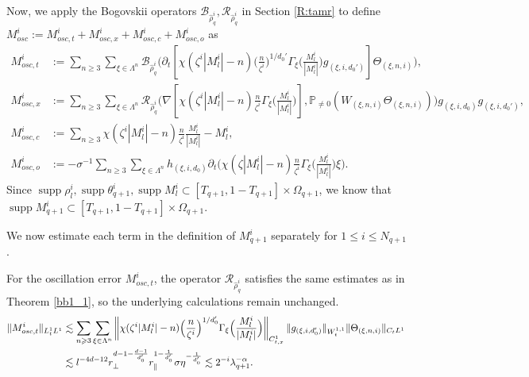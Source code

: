 \documentclass[UTF-8,reqno]{amsart}
\numberwithin{equation}{section}
\theoremstyle{definition}
\DeclareMathOperator{\supp}{supp}
\def\({{\Big(}}
\def\){{\Big)}}
\newcommand{\norm}[1]{\left\|#1\right\|}
\def\geq{\geqslant}
\def\leq{\leqslant}
\def\({{\Big(}}
\def\){{\Big)}}
\def\geq{\geqslant}
\def\leq{\leqslant}
\begin{document}
Now, we  apply the  Bogovskii  operators $\mathcal{B}_{\hat{\rho}_q^i},\mathcal{R}_{\hat{\rho}_q^i}$ in Section \ref{R:tamr} to   define $M^{i}_{osc}:=M^{i}_{osc,t}+M^{i}_{osc,x}+M^{i}_{osc,c}+M^{i}_{osc,o}$ as
\begin{align*}
   M^{i}_{osc,t}&:=\sum_{n\geq3}\sum_{\xi\in\Lambda^{n}}\mathcal{B}_{\hat{\rho}_q^i}\(\partial_t[\chi(\zeta^{i}|M^{i}_l|-n)\(\frac{n}{\zeta^{i}}\)^{1/d_0'}\Gamma_{\xi}\(\frac{M^{i}_l}{|M^{i}_l|}\)g_{(\xi,i,d_0')}]\Theta_{(\xi,n,i)}\),\\
M^{i}_{osc,x}&:=\sum_{n\geq3}\sum_{\xi\in\Lambda^{n}}\mathcal{R}_{\hat{\rho}_q^i}\(\nabla[\chi(\zeta^{i}|M^{i}_l|-n)\frac{n}{\zeta^{i}}\Gamma_{\xi}\(\frac{M^{i}_l}{|M^{i}_l|}\)],\mathbb{P}_{\neq0}(W_{(\xi,n,i)}\Theta_{(\xi,n,i)})\)g_{(\xi,i,d_0)}g_{(\xi,i,d_0')},\\
   M^{i}_{osc,c}&:=\sum_{n\geq3}\chi(\zeta^{i}|M^{i}_l|-n)\frac{n}{\zeta^{i}}\frac{M^{i}_l}{|M^{i}_l|}- M^{i}_l,\\
    M^{i}_{osc,o}&:=-\sigma^{-1}\sum_{n\geq3}\sum_{\xi\in\Lambda^{n}}h_{(\xi,i,d_0)}\partial_t\(\chi(\zeta|M_l^i|-n)\frac{n}{\zeta^i}\Gamma_{\xi}\(\frac{M_l^i}{|M_l^i|}\)\xi\).%
\end{align*}
Since $\supp \rho^i_l,\supp \theta_{q+1}^i,\supp M_l^i\subset[T_{q+1},1-T_{q+1}]\times\Omega_{q+1}$, we know that $\supp M_{q+1}^i\subset[T_{q+1},1-T_{q+1}]\times\Omega_{q+1}$.

 We now estimate each term in the definition of $M_{q+1}^i$ separately  for $1\leq i\leq N_{q+1}$.

For the oscillation error $M^{i}_{osc,t}$,  the operator $\mathcal{R}_{\hat{\rho}_q^i}$ satisfies the same estimates as in Theorem \ref{bb1_1}, so the underlying calculations remain unchanged.  
\begin{align}
    \|M^{i}_{osc,t}\|_{L^1_tL^1}%
    &\lesssim \sum_{n\geq3}\sum_{\xi\in\Lambda^{n}}\norm{\chi(\zeta^{i}|M^{i}_l|-n)\(\frac{n}{\zeta^{i}}\)^{1/d_0'}\Gamma_{\xi}\(\frac{M^{i}_l}{|M^{i}_l|}\)}_{C_{t,x}^1}\|g_{(\xi,i,d_0')}\|_{W_t^{1,1}} \|\Theta_{(\xi,n,i)}\|_{C_tL^1}\notag\\
    &\lesssim l^{-4d-12}r_\perp^{d-1-\frac{d-1}{d_0'}}r_\parallel^{1-\frac{1}{d_0'}}\sigma \eta^{-\frac{1}{d_0'}} \lesssim2^{-i} \lambda_{q+1}^{-\alpha}.\notag
\end{align} 
\end{document}
